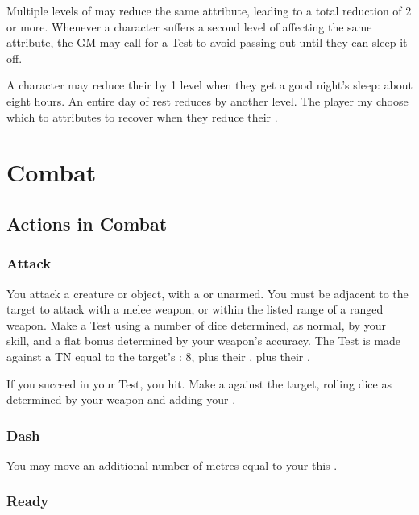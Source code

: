 Multiple levels of {\exhaustion} may reduce the same attribute, leading to a total reduction of 2 or more.
Whenever a character suffers a second level of {\exhaustion} affecting the same attribute, the GM may call for a Test to avoid passing out until they can sleep it off.

A character may reduce their {\exhaustion} by 1 level when they get a good night's sleep: about eight hours.
An entire day of rest reduces {\exhaustion} by another level.
The player my choose which to attributes to recover when they reduce their {\exhaustion}.

\section{Combat}

\subsection{Actions in Combat}

\subsubsection{Attack}

You attack a creature or object, with a  or unarmed.
You must be adjacent to the target to attack with a melee weapon, or within the listed range of a ranged weapon.
Make a Test using a number of dice determined, as normal, by your  skill, and a flat bonus determined by your weapon's accuracy.
The Test is made against a TN equal to the target's : 8, plus their , plus their .

If you succeed in your Test, you hit.
Make a {\damagetest} against the target, rolling dice as determined by your weapon and adding your .

\subsubsection{Dash}

You may move an additional number of metres equal to your  this {\turn}.

\subsubsection{Ready}

